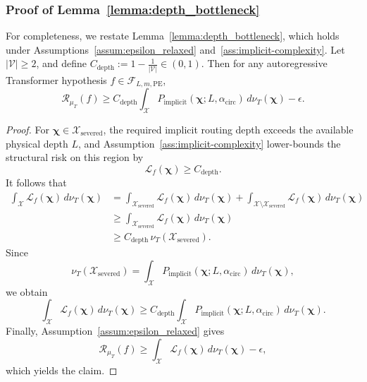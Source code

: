 \subsubsection{Proof of Lemma~\ref{lemma:depth_bottleneck}}
\label{app:proof-depth-bottleneck}

For completeness, we restate Lemma~\ref{lemma:depth_bottleneck}, which holds under Assumptions~\ref{assum:epsilon_relaxed} and~\ref{ass:implicit-complexity}. Let $|\mathcal{V}|\ge2$, and define $C_{\mathrm{depth}}:=1-\frac{1}{|\mathcal{V}|}\in(0,1)$. Then for any autoregressive Transformer hypothesis $f\in\mathcal{F}_{L,m,\mathrm{PE}}$,
\begin{equation}
\mathcal{R}_{\mu_T}(f)
\ge
C_{\mathrm{depth}}
\int_{\mathcal{X}}
P_{\mathrm{implicit}}(\boldsymbol{\chi};L,\alpha_{\mathrm{circ}})
\,d\nu_T(\boldsymbol{\chi})
-\epsilon.
\end{equation}

\begin{proof}
For $\boldsymbol{\chi}\in\mathcal{X}_{\mathrm{severed}}$, the required implicit routing depth exceeds the available physical depth $L$, and Assumption~\ref{ass:implicit-complexity} lower-bounds the structural risk on this region by
\begin{equation}
\mathcal{L}_f(\boldsymbol{\chi})\ge C_{\mathrm{depth}}.
\end{equation}
It follows that
\begin{align}
\int_{\mathcal{X}}
\mathcal{L}_f(\boldsymbol{\chi})\,d\nu_T(\boldsymbol{\chi})
&=
\int_{\mathcal{X}_{\mathrm{severed}}}
\mathcal{L}_f(\boldsymbol{\chi})\,d\nu_T(\boldsymbol{\chi})
+
\int_{\mathcal{X}\setminus\mathcal{X}_{\mathrm{severed}}}
\mathcal{L}_f(\boldsymbol{\chi})\,d\nu_T(\boldsymbol{\chi}) \\
&\ge
\int_{\mathcal{X}_{\mathrm{severed}}}
\mathcal{L}_f(\boldsymbol{\chi})\,d\nu_T(\boldsymbol{\chi}) \\
&\ge
C_{\mathrm{depth}}\,
\nu_T(\mathcal{X}_{\mathrm{severed}}).
\end{align}
Since
\begin{equation}
\nu_T(\mathcal{X}_{\mathrm{severed}})
=
\int_{\mathcal{X}}
P_{\mathrm{implicit}}(\boldsymbol{\chi};L,\alpha_{\mathrm{circ}})
\,d\nu_T(\boldsymbol{\chi}),
\end{equation}
we obtain
\begin{equation}
\int_{\mathcal{X}}
\mathcal{L}_f(\boldsymbol{\chi})\,d\nu_T(\boldsymbol{\chi})
\ge
C_{\mathrm{depth}}
\int_{\mathcal{X}}
P_{\mathrm{implicit}}(\boldsymbol{\chi};L,\alpha_{\mathrm{circ}})
\,d\nu_T(\boldsymbol{\chi}).
\end{equation}
Finally, Assumption~\ref{assum:epsilon_relaxed} gives
\begin{equation}
\mathcal{R}_{\mu_T}(f)
\ge
\int_{\mathcal{X}}
\mathcal{L}_f(\boldsymbol{\chi})\,d\nu_T(\boldsymbol{\chi})
-\epsilon,
\end{equation}
which yields the claim.
\end{proof}

